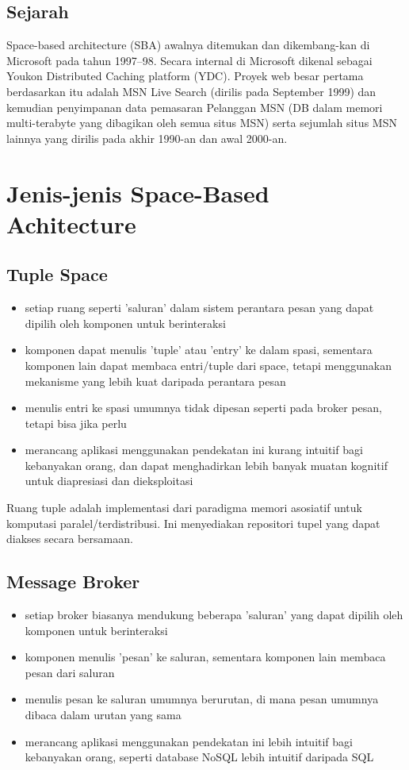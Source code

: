 	\subsection*{\LARGE{Sejarah}}
	\large Space-based architecture (SBA) awalnya ditemukan dan dikembang-kan di Microsoft pada tahun 1997–98. Secara internal di Microsoft dikenal sebagai Youkon Distributed Caching platform (YDC). Proyek web besar pertama berdasarkan itu adalah MSN Live Search (dirilis pada September 1999) dan kemudian penyimpanan data pemasaran Pelanggan MSN (DB dalam memori multi-terabyte yang dibagikan oleh semua situs MSN) serta sejumlah situs MSN lainnya yang dirilis pada akhir 1990-an dan awal 2000-an.
	\section*{\huge{Jenis-jenis Space-Based Achitecture}}
	\subsection*{\LARGE{Tuple Space}}
	\begin{itemize}
		\item \large setiap ruang seperti 'saluran' dalam sistem perantara pesan yang dapat dipilih oleh komponen untuk berinteraksi
		\item \large komponen dapat menulis 'tuple' atau 'entry' ke dalam spasi, sementara komponen lain dapat membaca entri/tuple dari space, tetapi menggunakan mekanisme yang lebih kuat daripada perantara pesan
		\item \large menulis entri ke spasi umumnya tidak dipesan seperti pada broker pesan, tetapi bisa jika perlu
		\item \large merancang aplikasi menggunakan pendekatan ini kurang intuitif bagi kebanyakan orang, dan dapat menghadirkan lebih banyak muatan kognitif untuk diapresiasi dan dieksploitasi
	\end{itemize}
	\large Ruang tuple adalah implementasi dari paradigma memori asosiatif untuk komputasi paralel/terdistribusi. Ini menyediakan repositori tupel yang dapat diakses secara bersamaan.
	\subsection*{\LARGE{Message Broker}}
	\begin{itemize}
		\item \large setiap broker biasanya mendukung beberapa 'saluran' yang dapat dipilih oleh komponen untuk berinteraksi
		\item \large komponen menulis 'pesan' ke saluran, sementara komponen lain membaca pesan dari saluran
		\item \large menulis pesan ke saluran umumnya berurutan, di mana pesan umumnya dibaca dalam urutan yang sama
		\item \large merancang aplikasi menggunakan pendekatan ini lebih intuitif bagi kebanyakan orang, seperti database NoSQL lebih intuitif daripada SQL
	\end{itemize}
